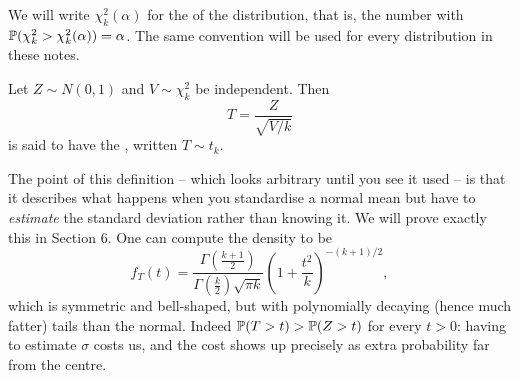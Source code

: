 \documentclass[a4paper]{scrartcl}
\begin{document}
We will write $\chi^2_k(\alpha)$ for the  of the distribution, that is, the number with $\mathbb{P}(\chi^2_k > \chi^2_k(\alpha)) = \alpha$. The same convention will be used for every distribution in these notes.

\begin{definition}
  Let $Z \sim N(0,1)$ and $V \sim \chi^2_k$ be independent. Then
  $$
  T = \frac{Z}{\sqrt{V/k}}
  $$
  is said to have the , written $T \sim t_k$.
\end{definition}

The point of this definition -- which looks arbitrary until you see it used -- is that it describes what happens when you standardise a normal mean but have to \emph{estimate} the standard deviation rather than knowing it. We will prove exactly this in Section 6. One can compute the density to be
$$
f_T(t) = \frac{\Gamma\left(\frac{k+1}{2}\right)}{\Gamma\left(\frac{k}{2}\right)\sqrt{\pi k}}\left(1 + \frac{t^2}{k}\right)^{-(k+1)/2},
$$
which is symmetric and bell-shaped, but with polynomially decaying (hence much fatter) tails than the normal. Indeed $\mathbb{P}(T > t) > \mathbb{P}(Z > t)$ for every $t > 0$: having to estimate $\sigma$ costs us, and the cost shows up precisely as extra probability far from the centre.
\end{document}
